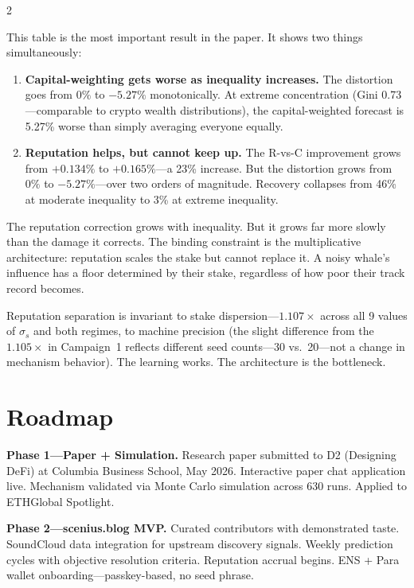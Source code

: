 \documentclass[9pt,oneside]{amsart}
\begin{document}
\begin{multicols}{2}

This table is the most important result in the paper. It shows two things simultaneously:

\begin{enumerate}[nosep]
  \item \textbf{Capital-weighting gets worse as inequality increases.} The distortion goes from $0\%$ to $-5.27\%$ monotonically. At extreme concentration (Gini 0.73---comparable to crypto wealth distributions), the capital-weighted forecast is 5.27\% worse than simply averaging everyone equally.
  \item \textbf{Reputation helps, but cannot keep up.} The R-vs-C improvement grows from $+0.134\%$ to $+0.165\%$---a 23\% increase. But the distortion grows from $0\%$ to $-5.27\%$---over two orders of magnitude. Recovery collapses from 46\% at moderate inequality to 3\% at extreme inequality.
\end{enumerate}

The reputation correction grows with inequality. But it grows far more slowly than the damage it corrects. The binding constraint is the multiplicative architecture: reputation scales the stake but cannot replace it. A noisy whale's influence has a floor determined by their stake, regardless of how poor their track record becomes.

Reputation separation is invariant to stake dispersion---$1.107\times$ across all 9 values of $\sigma_s$ and both regimes, to machine precision (the slight difference from the $1.105\times$ in Campaign~1 reflects different seed counts---30 vs.\ 20---not a change in mechanism behavior). The learning works. The architecture is the bottleneck.

\section{Roadmap}

\textbf{Phase 1---Paper + Simulation.} Research paper submitted to D2 (Designing DeFi) at Columbia Business School, May 2026. Interactive paper chat application live. Mechanism validated via Monte Carlo simulation across 630 runs. Applied to ETHGlobal Spotlight.

\textbf{Phase 2---scenius.blog MVP.} Curated contributors with demonstrated taste. SoundCloud data integration for upstream discovery signals. Weekly prediction cycles with objective resolution criteria. Reputation accrual begins. ENS + Para wallet onboarding---passkey-based, no seed phrase.


\end{multicols}
\end{document}
